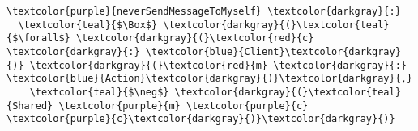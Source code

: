 \begin{Verbatim}[commandchars=\\\{\},codes={\catcode`$=3}]
\textcolor{purple}{neverSendMessageToMyself} \textcolor{darkgray}{:} 
  \textcolor{teal}{$\Box$} \textcolor{darkgray}{(}\textcolor{teal}{$\forall$} \textcolor{darkgray}{(}\textcolor{red}{c} \textcolor{darkgray}{:} \textcolor{blue}{Client}\textcolor{darkgray}{)} \textcolor{darkgray}{(}\textcolor{red}{m} \textcolor{darkgray}{:} \textcolor{blue}{Action}\textcolor{darkgray}{)}\textcolor{darkgray}{,} 
    \textcolor{teal}{$\neg$} \textcolor{darkgray}{(}\textcolor{teal}{Shared} \textcolor{purple}{m} \textcolor{purple}{c} \textcolor{purple}{c}\textcolor{darkgray}{)}\textcolor{darkgray}{)}
\end{Verbatim}
